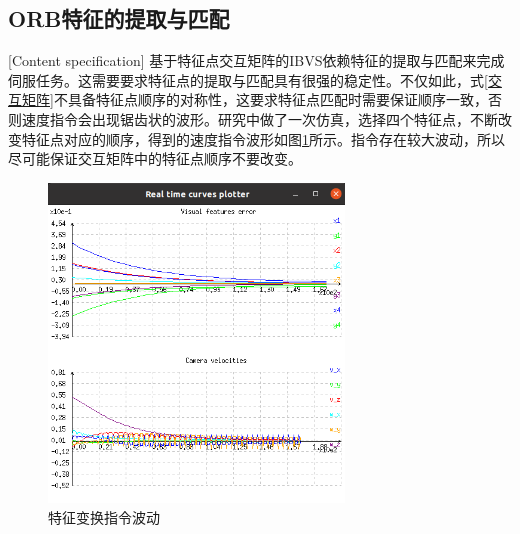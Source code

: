 \documentclass[fontset=fandol,type=bachelor,campus=harbin,bsmainpagenumberline=true]{hithesisbook}
\begin{document}
\subsection{ORB特征的提取与匹配}[Content specification]
基于特征点交互矩阵的IBVS依赖特征的提取与匹配来完成伺服任务。这需要要求特征点的提取与匹配具有很强的稳定性。不仅如此，式\ref{交互矩阵}不具备特征点顺序的对称性，这要求特征点匹配时需要保证顺序一致，否则速度指令会出现锯齿状的波形。研究中做了一次仿真，选择四个特征点，不断改变特征点对应的顺序，得到的速度指令波形如图\ref{特征变换指令波动}所示。指令存在较大波动，所以尽可能保证交互矩阵中的特征点顺序不要改变。
\begin{figure}[h]
\centering
\includegraphics[width = 0.7\textwidth]{chapter4/特征变换指令波动}
\caption{特征变换指令波动}
\label{特征变换指令波动}
\end{figure}
\end{document}
